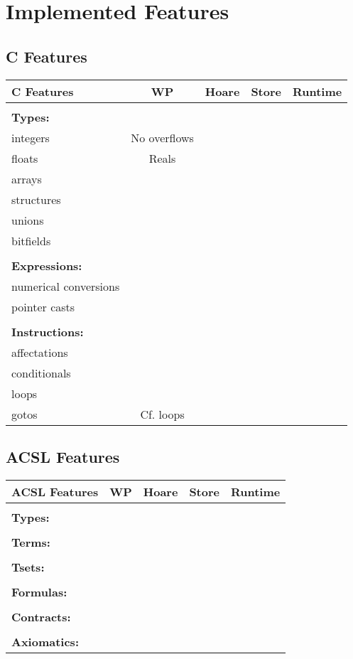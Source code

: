 \chapter{Implemented Features}


\newenvironment{wpfeatures}[1]%
{\begin{longtable}{lcccc}
 \textbf{#1} & WP & Hoare & Store & Runtime \\\hline
 \endhead
}%
{\end{longtable}}
\newcommand{\wpsection}[1]{\\\textbf{#1:} & & & & \\}
\newcommand{\wyes}{\ding{51}}
\newcommand{\wno} {\ding{53}}

\section{C Features}

\begin{wpfeatures}{C Features}
\wpsection{Types}
integers   & No overflows & & & \\
floats     & Reals & & & \\
arrays     & & \wyes & \wyes & \wyes \\
structures & & \wyes & \wyes & \wyes \\
unions     & & \wno  & \wno  & \wyes  \\
bitfields  & & \wno  & \wno  & \wno  \\
\wpsection{Expressions}
numerical conversions & \wyes & & & \\
pointer casts & & \wno & \wno & \wyes \\
\wpsection{Instructions}
affectations & \wyes & & & \\
conditionals & \wyes & & & \\
loops        & \wyes & & & \\
gotos        & Cf. loops & & & \\
\end{wpfeatures}

\section{ACSL Features}

\begin{wpfeatures}{ACSL Features}
\wpsection{Types}
\wpsection{Terms}
\wpsection{Tsets}
\wpsection{Formulas}
\wpsection{Contracts}
\wpsection{Axiomatics}
\end{wpfeatures}
